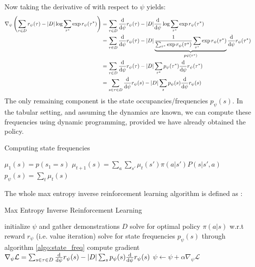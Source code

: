 Now taking the derivative of with respect to $\psi$ yields:
\begin{align*}
     \nabla_\psi \left( \sum_{\tau \in D}r_{\psi}(\tau) - |D|\log{\sum_{\tau^*} \exp{r_\psi(\tau^*)}}\right) &=
    \sum_{\tau \in D}   \frac{\diff}{\diff \psi} r_{\psi}(\tau) - |D| \frac{\diff}{\diff \psi}\log{\sum_{\tau^*} \exp{r_\psi(\tau^*)}} \\
    &= \sum_{\tau \in D}  \frac{\diff}{\diff \psi} r_{\psi}(\tau) - |D|
    \underbrace{\frac{1}{\sum_{\tau^*} \exp{r_\psi(\tau^*)}} \sum_{\tau^*} \exp{r_\psi(\tau^*)}}_{p\psi(\tau^*)} 
    \frac{\diff}{\diff \psi} r_\psi(\tau^*) \\
    &= \sum_{\tau \in D}  \frac{\diff}{\diff \psi} r_{\psi}(\tau) - |D| \sum_{\tau^*}p_\psi(\tau^*)  \frac{\diff}{\diff \psi} r_\psi(\tau^*)  \\
    &=  \sum_{s\in \tau \in D}  \frac{\diff}{\diff \psi} r_{\psi}(s) - |D| \sum_{s}p_\psi(s)  \frac{\diff}{\diff \psi} r_\psi(s) 
\end{align*}
The only remaining component is the state occupancies/frequencies $p_\psi(s)$. In the tabular setting, and assuming the dynamics are known, 
we can compute these frequencies using dynamic programming, provided we have already obtained the policy.
\begin{algorithm}[H]
    \caption{Computing state frequencies }\label{algo:state_freq}
    \begin{algorithmic}
    \STATE {}
    \STATE {}
    \STATE $\mu_1(s) = p(s_1 = s)$ 
    \STATE $\mu_{t+1}(s) = \sum_a \sum_{s'} \mu_t(s')\pi(a|s')P(s|s',a)$
    \ENDFOR
    \STATE $p_\psi(s) = \sum_t \mu_t(s)$
    \end{algorithmic}
\end{algorithm}
The whole max entropy inverse reinforcement learning algorithm is defined as :
\begin{algorithm}[H]
    \caption{Max Entropy Inverse Reinforcement Learning  }\label{algo:maxEntIRL}
    \begin{algorithmic}
    \STATE initialize $\psi$ and gather demonstrations $D$
    \STATE solve for optimal policy $\pi(a|s)$ w.r.t reward $r_\psi$ (i.e. value iteration)
    \STATE solve for state frequencies $p_\psi(s)$ through algorithm \ref{algo:state_freq} 
    \STATE compute gradient $ \nabla_\psi \mathcal{L} = \sum_{s\in \tau \in D}  \frac{\mathop{}\!\mathrm{d}}{\mathop{}\!\mathrm{d} \psi} r_{\psi}(s) - |D| \sum_{s}p_\psi(s)  \frac{\mathop{}\!\mathrm{d}}{\mathop{}\!\mathrm{d} \psi} r_\psi(s) $
    \STATE $\psi \gets \psi + \alpha \nabla_\psi \mathcal{L}$
    \ENDFOR
    \end{algorithmic}
\end{algorithm}
